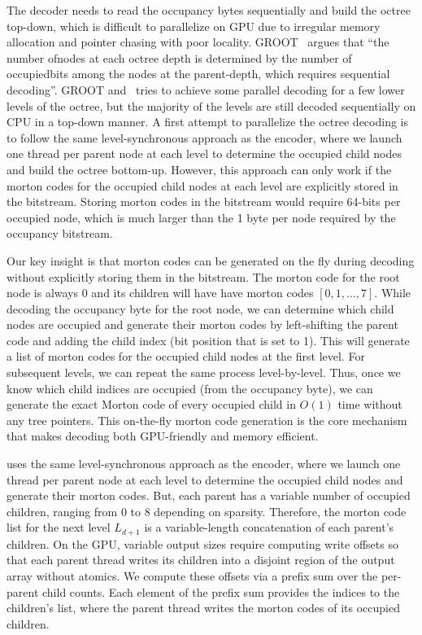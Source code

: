 The decoder needs to read the occupancy bytes sequentially and build the octree top-down, which is difficult to parallelize on GPU due to irregular memory allocation and pointer chasing with poor locality.
%
GROOT~\cite{groot} argues that ``the number ofnodes at each octree depth is determined by the number of occupiedbits among the nodes at the parent-depth, which requires sequential decoding''.
%
GROOT and~\cite{octree-cpu2020} tries to achieve some parallel decoding for a few lower levels of the octree, but the majority of the levels are still decoded sequentially on CPU in a top-down manner.
%
A first attempt to parallelize the octree decoding is to follow the same level-synchronous approach as the encoder, where we launch one thread per parent node at each level to determine the occupied child nodes and build the octree bottom-up.
%
However, this approach can only work if the morton codes for the occupied child nodes at each level are explicitly stored in the bitstream.
%
Storing morton codes in the bitstream would require 64-bits per occupied node, which is much larger than the 1 byte per node required by the occupancy bitstream.

Our key insight is that morton codes can be generated on the fly during decoding without explicitly storing them in the bitstream.
%
The morton code for the root node is always 0 and its children will have have morton codes $[0,1,\ldots,7]$.
%
While decoding the occupancy byte for the root node, we can determine which child nodes are occupied and generate their morton codes by left-shifting the parent code and adding the child index (bit position that is set to 1).
%
This will generate a list of morton codes for the occupied child nodes at the first level.
%
For subsequent levels, we can repeat the same process level-by-level.
%
Thus, once we know which child indices are occupied (from the occupancy byte), we can generate the exact Morton code of every occupied child in $O(1)$ time without any tree pointers.
%
This on-the-fly morton code generation is the core mechanism that makes decoding both GPU-friendly and memory efficient.
%

\gsnfs uses the same level-synchronous approach as the encoder, where we launch one thread per parent node at each level to determine the occupied child nodes and generate their morton codes.
%
But, each parent has a variable number of occupied children, ranging from 0 to 8 depending on sparsity.
%
Therefore, the morton code list for the next level $L_{d+1}$ is a variable-length concatenation of each parent's children.
%
On the GPU, variable output sizes require computing write offsets so that each parent thread writes its children into a disjoint region of the output array without atomics.
%
We compute these offsets via a prefix sum over the per-parent child counts.
%
Each element of the prefix sum provides the indices to the children's list, where the parent thread writes the morton codes of its occupied children.

